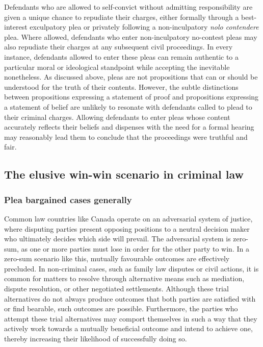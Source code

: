 Defendants who are allowed to self-convict without admitting responsibility are given a unique chance to repudiate their charges, either formally through a best-interest exculpatory plea or privately following a non-inculpatory \textit{nolo contendere} plea. Where allowed, defendants who enter non-inculpatory no-contest pleas may also repudiate their charges at any subsequent civil proceedings. In every instance, defendants allowed to enter these pleas can remain authentic to a particular moral or ideological standpoint while accepting the inevitable nonetheless. As discussed above, pleas are not propositions that can or should be understood for the truth of their contents. However, the subtle distinctions between propositions expressing a statement of proof and propositions expressing a statement of belief are unlikely to resonate with defendants called to plead to their criminal charges. Allowing defendants to enter pleas whose content accurately reflects their beliefs and dispenses with the need for a formal hearing may reasonably lead them to conclude that the proceedings were truthful and fair. 

\subsection{The elusive win-win scenario in criminal law}

\subsubsection{Plea bargained cases generally}

Common law countries like Canada operate on an adversarial system of justice, where disputing parties present opposing positions to a neutral decision maker who ultimately decides which side will prevail. The adversarial system is zero-sum, as one or more parties must lose in order for the other party to win. In a zero-sum scenario like this, mutually favourable outcomes are effectively precluded. In non-criminal cases, such as family law disputes or civil actions, it is common for matters to resolve through alternative means such as mediation, dispute resolution, or other negotiated settlements. Although these trial alternatives do not always produce outcomes that both parties are satisfied with or find bearable, such outcomes are possible. Furthermore, the parties who attempt these trial alternatives may comport themselves in such a way that they actively work towards a mutually beneficial outcome and intend to achieve one, thereby increasing their likelihood of successfully doing so.

